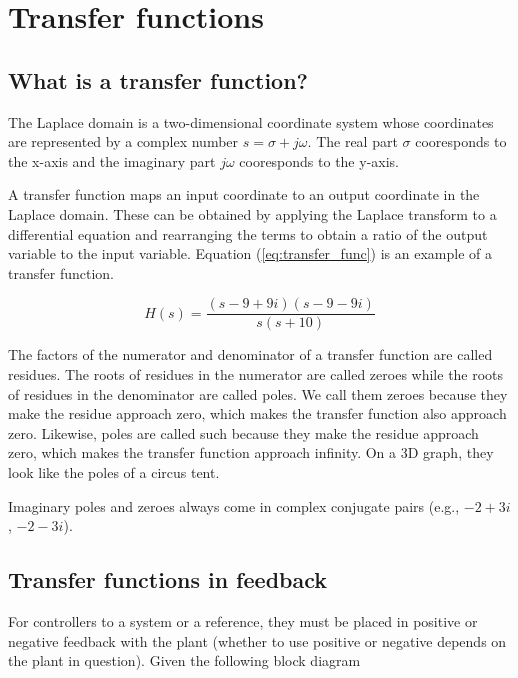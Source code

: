 
\chapter{Transfer functions}

\section{What is a transfer function?}

The Laplace domain is a two-dimensional coordinate system whose coordinates are
represented by a complex number $s = \sigma + j\omega$. The real part $\sigma$
cooresponds to the x-axis and the imaginary part $j\omega$ cooresponds to the
y-axis.

A transfer function maps an input coordinate to an output coordinate in the
Laplace domain. These can be obtained by applying the Laplace transform to a
differential equation and rearranging the terms to obtain a ratio of the output
variable to the input variable. Equation (\ref{eq:transfer_func}) is an example
of a transfer function.

\begin{equation} \label{eq:transfer_func}
  H(s) = \frac{(s-9+9i)(s-9-9i)}{s(s+10)}
\end{equation}

The factors of the numerator and denominator of a transfer function are called
residues. The roots of residues in the numerator are called zeroes while the
roots of residues in the denominator are called poles. We call them zeroes
because they make the residue approach zero, which makes the transfer function
also approach zero. Likewise, poles are called such because they make the
residue approach zero, which makes the transfer function approach infinity. On a
3D graph, they look like the poles of a circus tent.

Imaginary poles and zeroes always come in complex conjugate pairs (e.g.,
$-2 + 3i$, $-2 - 3i$).

\section{Transfer functions in feedback}

For \glspl{controller} to  a system or
 a reference, they must be placed in positive or
negative feedback with the \gls{plant} (whether to use positive or negative
depends on the \gls{plant} in question). Given the following block diagram

